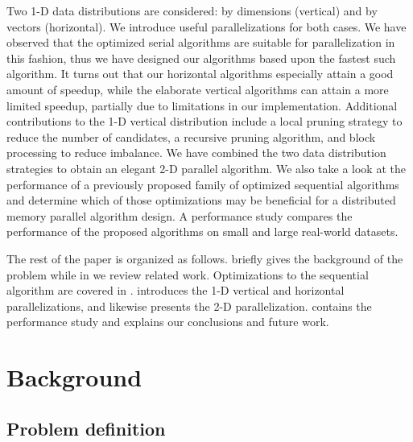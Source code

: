 \documentclass{comjnl}
\begin{document}
Two 1-D data distributions are considered: by
dimensions (vertical) and by vectors (horizontal). We introduce useful
parallelizations for both cases.  We have observed that the optimized
serial algorithms are suitable for parallelization in this fashion,
thus we have designed our algorithms based upon the fastest such
algorithm.  It turns out that our horizontal algorithms especially
attain a good amount of speedup, while the elaborate vertical
algorithms can attain a more limited speedup, partially due to
limitations in our implementation. Additional contributions to
the 1-D vertical distribution include a local pruning strategy to 
reduce the number of candidates, a recursive pruning algorithm, 
and block processing to reduce imbalance.  
We have combined the two data
distribution strategies to obtain an elegant 2-D parallel algorithm. We also
take a look at the performance of a previously proposed family of
optimized sequential algorithms and determine which of those
optimizations may be beneficial for a distributed memory parallel
algorithm design. A performance study compares the performance of the
proposed algorithms on small and large real-world datasets.

The rest of the paper is organized as
follows.  briefly gives the background of
the problem while in  we review related
work. Optimizations to the sequential algorithm are covered in
.   introduces the 1-D
vertical and horizontal parallelizations, and likewise
 presents the 2-D
parallelization.  contains the performance study
and  explains our conclusions and future work.

\section{Background}
\label{sec:background}

\subsection{Problem definition}
\end{document}
